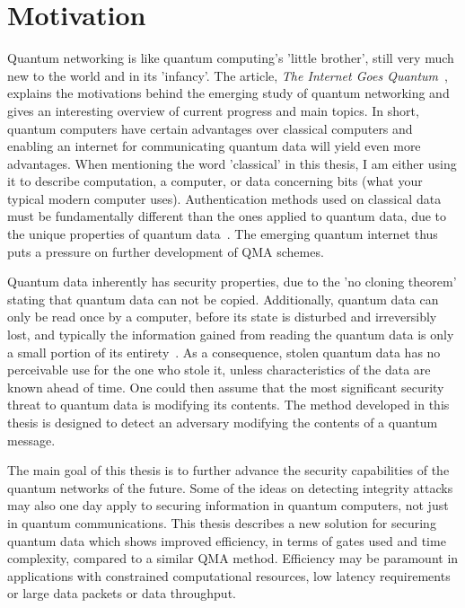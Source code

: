 \chapter{Motivation}
\label{sec:Motivation}
Quantum networking is like quantum computing's 'little brother', still very much new to the world and in its 'infancy'. The article, \emph{The Internet Goes Quantum}~\cite{popkin2021internet}, explains the motivations behind the emerging study of quantum networking and gives an interesting overview of current progress and main topics. In short, quantum computers have certain advantages over classical computers and enabling an internet for communicating quantum data will yield even more advantages. When mentioning the word 'classical' in this thesis, I am either using it to describe computation, a computer, or data concerning bits (what your typical modern computer uses). Authentication methods used on classical data must be fundamentally different than the ones applied to quantum data, due to the unique properties of quantum data~\cite{barnum2002authentication}. The emerging quantum internet thus puts a pressure on further development of QMA schemes.

Quantum data inherently has security properties, due to the 'no cloning theorem' stating that quantum data can not be copied. Additionally, quantum data can only be read once by a computer, before its state is disturbed and irreversibly lost, and typically the information gained from reading the quantum data is only a small portion of its entirety~\cite{nielsen2002quantum}. As a consequence, stolen quantum data has no perceivable use for the one who stole it, unless characteristics of the data are known ahead of time. One could then assume that the most significant security threat to quantum data is modifying its contents. The method developed in this thesis is designed to detect an adversary modifying the contents of a quantum message.

The main goal of this thesis is to further advance the security capabilities of the quantum networks of the future. Some of the ideas on detecting integrity attacks may also one day apply to securing information in quantum computers, not just in quantum communications. This thesis describes a new solution for securing quantum data which shows improved efficiency, in terms of gates used and time complexity, compared to a similar QMA method. Efficiency may be paramount in applications with constrained computational resources, low latency requirements or large data packets or data throughput.



